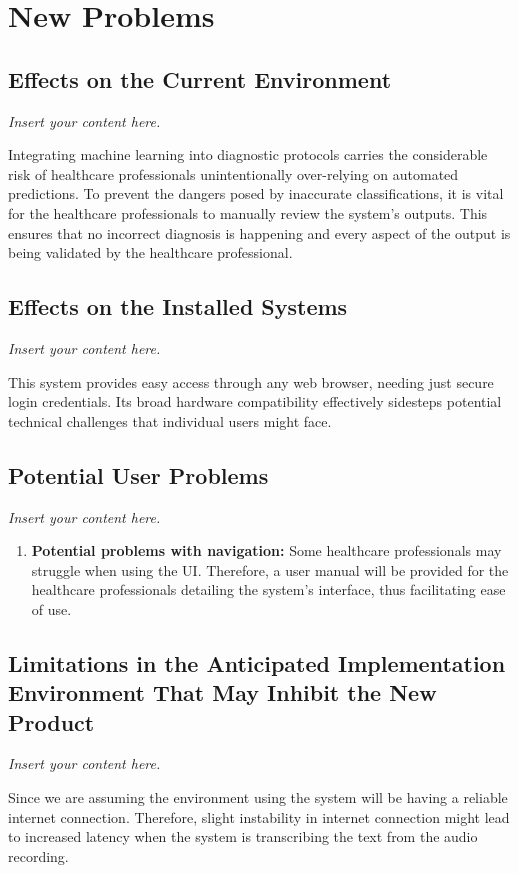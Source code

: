\documentclass[12pt]{article}
\newcommand{\lips}{\textit{Insert your content here.}}
\begin{document}
\section{New Problems}
\subsection{Effects on the Current Environment}
\lips

Integrating machine learning into diagnostic protocols carries the considerable risk of healthcare professionals unintentionally over-relying on automated predictions. To prevent the dangers posed by inaccurate classifications, it is vital for the healthcare professionals to manually review the system's outputs. This ensures that no incorrect diagnosis is happening and every aspect of the output is being validated by the healthcare professional.

\subsection{Effects on the Installed Systems}
\lips

This system provides easy access through any web browser, needing just secure login credentials. Its broad hardware compatibility effectively sidesteps potential technical challenges that individual users might face.

\subsection{Potential User Problems}
\lips

\begin{enumerate}
  \item \textbf{Potential problems with navigation:} Some healthcare professionals may struggle when using the UI. Therefore, a user manual will be provided for the healthcare professionals detailing the system's interface, thus facilitating ease of use.
\end{enumerate}

\subsection{Limitations in the Anticipated Implementation Environment That May
Inhibit the New Product}
\lips

Since we are assuming the environment using the system will be having a reliable internet connection. Therefore, slight instability in internet connection might lead to increased latency when the system is transcribing the text from the audio recording. 
\end{document}
